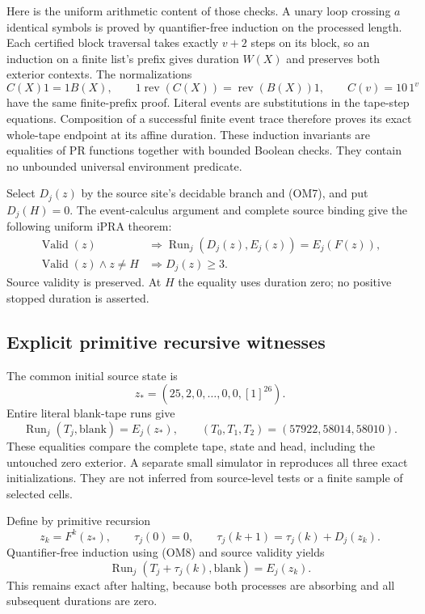 Here is the uniform arithmetic content of those checks.  A unary loop
crossing $a$ identical symbols is proved by quantifier-free induction on
the processed length.  Each certified block traversal takes exactly
$v+2$ steps on its block, so an induction on a finite list's prefix gives
duration $W(X)$ and preserves both exterior contexts.  The normalizations
\[
 C(X)1=1B(X),\qquad
 1\operatorname{rev}(C(X))=\operatorname{rev}(B(X))1,
 \qquad C(v)=10\,1^v
\]
have the same finite-prefix proof.  Literal events are substitutions in
the tape-step equations.  Composition of a successful finite event trace
therefore proves its exact whole-tape endpoint at its affine duration.
These induction invariants are equalities of PR functions together with
bounded Boolean checks.  They contain no unbounded universal environment
predicate.

Select $D_j(z)$ by the source site's decidable branch and (OM7), and put
$D_j(H)=0$.  The event-calculus argument and complete source binding give
the following uniform iPRA theorem:
\[
 \begin{split}
 \operatorname{Valid}(z)&\Longrightarrow
       \operatorname{Run}_j(D_j(z),E_j(z))=E_j(F(z)),\\
 \operatorname{Valid}(z)\land z\ne H&\Longrightarrow D_j(z)\ge3.
\end{split}                                                \tag{OM8}
\]
Source validity is preserved.  At $H$ the equality uses duration zero;
no positive stopped duration is asserted.

\subsection{Explicit primitive recursive witnesses}

The common initial source state is
\[
                   z_*=(25,2,0,\ldots,0,0,[1]^{26}).
\]
Entire literal blank-tape runs give
\[
 \operatorname{Run}_j(T_j,\mathrm{blank})=E_j(z_*),
 \qquad (T_0,T_1,T_2)=(57922,58014,58010).                  \tag{OM9}
\]
These equalities compare the complete tape, state and head, including the
untouched zero exterior.  A separate small simulator in
 reproduces all three exact initializations.
They are not inferred from source-level tests or a finite sample of
selected cells.

Define by primitive recursion
\[
 z_k=F^k(z_*),\qquad \tau_j(0)=0,\qquad
 \tau_j(k+1)=\tau_j(k)+D_j(z_k).
\]
Quantifier-free induction using (OM8) and source validity yields
\[
 \operatorname{Run}_j(T_j+\tau_j(k),\mathrm{blank})=E_j(z_k).
                                                               \tag{OM10}
\]
This remains exact after halting, because both processes are absorbing
and all subsequent durations are zero.

